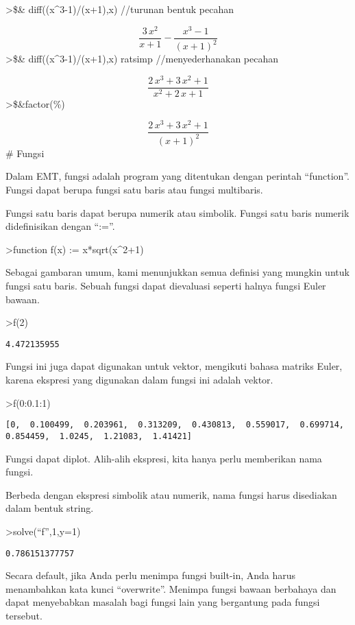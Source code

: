 \documentclass[
]{book}
\begin{document}
\textgreater\$\& diff((x\^{}3-1)/(x+1),x) //turunan bentuk pecahan

\[\frac{3\,x^2}{x+1}-\frac{x^3-1}{\left(x+1\right)^2}\]\textgreater\$\& diff((x\^{}3-1)/(x+1),x) \textbar{} ratsimp //menyederhanakan pecahan

\[\frac{2\,x^3+3\,x^2+1}{x^2+2\,x+1}\]\textgreater\$\&factor(\%)

\[\frac{2\,x^3+3\,x^2+1}{\left(x+1\right)^2}\]\# Fungsi

Dalam EMT, fungsi adalah program yang ditentukan dengan perintah ``function''. Fungsi dapat berupa fungsi satu baris atau fungsi multibaris.

Fungsi satu baris dapat berupa numerik atau simbolik. Fungsi satu baris numerik didefinisikan dengan ``:=''.

\textgreater function f(x) := x*sqrt(x\^{}2+1)

Sebagai gambaran umum, kami menunjukkan semua definisi yang mungkin untuk fungsi satu baris. Sebuah fungsi dapat dievaluasi seperti halnya fungsi Euler bawaan.

\textgreater f(2)

\begin{verbatim}
4.472135955
\end{verbatim}

Fungsi ini juga dapat digunakan untuk vektor, mengikuti bahasa matriks Euler, karena ekspresi yang digunakan dalam fungsi ini adalah vektor.

\textgreater f(0:0.1:1)

\begin{verbatim}
[0,  0.100499,  0.203961,  0.313209,  0.430813,  0.559017,  0.699714,
0.854459,  1.0245,  1.21083,  1.41421]
\end{verbatim}

Fungsi dapat diplot. Alih-alih ekspresi, kita hanya perlu memberikan nama fungsi.

Berbeda dengan ekspresi simbolik atau numerik, nama fungsi harus disediakan dalam bentuk string.

\textgreater solve(``f'',1,y=1)

\begin{verbatim}
0.786151377757
\end{verbatim}

Secara default, jika Anda perlu menimpa fungsi built-in, Anda harus menambahkan kata kunci ``overwrite''. Menimpa fungsi bawaan berbahaya dan dapat menyebabkan masalah bagi fungsi lain yang bergantung pada fungsi tersebut.
\end{document}
